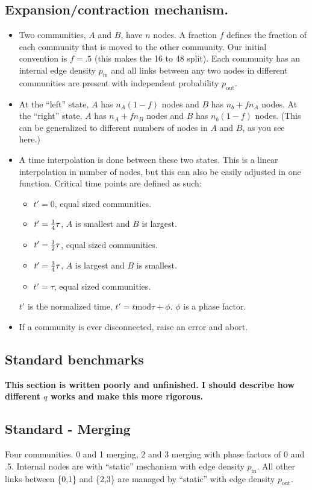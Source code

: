 \documentclass{article}
\def\pin{p_\mathrm{in}}
\def\pout{p_\mathrm{out}}
\begin{document}
\subsection{Expansion/contraction mechanism.}
\begin{itemize}
\item Two communities, $A$ and $B$, have $n$ nodes.  A fraction $f$
  defines the fraction of each community that is moved to the other
  community.  Our initial convention is $f=.5$ (this makes the 16 to
  48 split).  Each community has an
  internal edge density $\pin$ and all links between any two nodes in
  different communities are present with independent probability
  $\pout$.
\item At the ``left'' state, $A$ has $n_A(1-f)$ nodes and $B$ has
  $n_b+f n_A$ nodes.  At the ``right'' state, $A$ has $n_A + f n_B$
  nodes and $B$ has $n_b(1-f)$ nodes.  (This can be generalized to
  different numbers of nodes in $A$ and $B$, as you see here.)
\item A time interpolation is done between these two states.  This is
  a linear interpolation in number of nodes, but this can also be
  easily adjusted in one function.  Critical time points are defined
  as such:
  \begin{itemize}
  \item $t'=0$, equal sized communities.
  \item $t'={1 \over 4} \tau$, $A$ is smallest and $B$ is largest.
  \item $t'={1 \over 2} \tau$, equal sized communities.
  \item $t'={3 \over 4} \tau$, $A$ is largest and $B$ is smallest.
  \item $t'=\tau$, equal sized communities.
  \end{itemize}
  $t'$ is the normalized time, $t' = t \mathrm{mod} \tau + \phi$.  $\phi$ is a
  phase factor.
\item If a community is ever disconnected, raise an error and abort.
\end{itemize}



\subsection{Standard benchmarks}

\textbf{This section is written poorly and unfinished.  I should
  describe how different $q$ works and make this more rigorous.}

\subsection{Standard - Merging}
Four communities.  0 and 1 merging, 2 and 3 merging with phase
factors of 0 and .5.  Internal nodes are with ``static'' mechanism with
edge density $\pin$.  All other links between \{0,1\} and \{2,3\} are
managed by ``static'' with edge density $\pout$.
\end{document}
